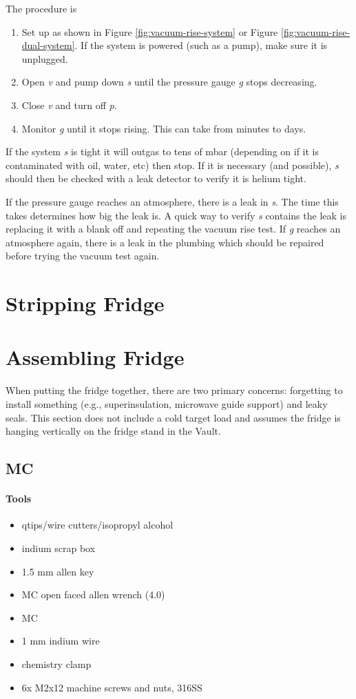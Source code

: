 The procedure is
\begin{enumerate}
 \item Set up as shown in Figure \ref{fig:vacuum-rise-system} or Figure \ref{fig:vacuum-rise-dual-system}.  If the system is powered (such as a pump), make sure it is unplugged.
 \item Open \textit{v} and pump down \textit{s} until the pressure gauge \textit{g} stops decreasing.
 \item Close \textit{v} and turn off \textit{p}.
 \item Monitor \textit{g} until it stops rising.  This can take from minutes to days.
\end{enumerate}

If the system \textit{s} is tight it will outgas to tens of mbar (depending on if it is contaminated with oil, water, etc) then stop.  If it is necessary (and possible), \textit{s} should then be checked with a leak detector to verify it is helium tight.

If the pressure gauge reaches an atmosphere, there is a leak in \textit{s}.  The time this takes determines how big the leak is.  A quick way to verify \textit{s} contains the leak is replacing it with a blank off and repeating the vacuum rise test.  If \textit{g} reaches an atmosphere again, there is a leak in the plumbing which should be repaired before trying the vacuum test again.

\section{Stripping Fridge}

\section{Assembling Fridge}

When putting the fridge together, there are two primary concerns: forgetting to install something (e.g., superinsulation, microwave guide support) and leaky seals.  This section does not include a cold target load and assumes the fridge is hanging vertically on the fridge stand in the Vault.

\subsection{MC}
\paragraph{Tools}
\begin{itemize}
 \item qtips/wire cutters/isopropyl alcohol
\item indium scrap box
\item 1.5 mm allen key
\item MC open faced allen wrench (4.0)
\item MC
\item 1 mm indium wire
\item chemistry clamp
\item 6x M2x12 machine screws and nuts, 316SS
\end{itemize}

